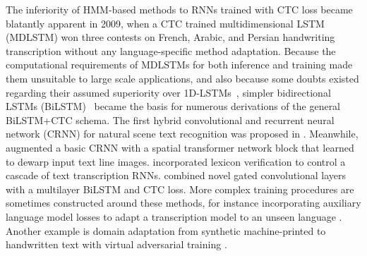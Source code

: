 The inferiority of HMM-based methods to RNNs trained with CTC loss became
blatantly apparent in 2009, when a CTC trained multidimensional LSTM (MDLSTM)
\cite{graves2008offline} won three contests on French, Arabic, and Persian
handwriting transcription without any language-specific method adaptation.
Because the computational requirements of MDLSTMs for both inference and
training made them unsuitable to large scale applications, and also because
some doubts existed regarding their assumed superiority over
1D-LSTMs~\cite{puigcerver2017multidimensional}, simpler bidirectional LSTMs
(BiLSTM)~\cite{graves2008novel} became the basis for numerous derivations of
the general BiLSTM+CTC schema. The first hybrid convolutional and recurrent
neural network (CRNN) for natural scene text recognition was proposed in
\cite{shi2016end}. Meanwhile, \cite{dutta2018improving} augmented a basic CRNN
with a spatial transformer network block that learned to dewarp input text line
images. \cite{stuner2016cohort} incorporated lexicon verification to control a
cascade of text transcription RNNs. \cite{bluche2017gated} combined novel gated
convolutional layers with a multilayer BiLSTM and CTC loss. More complex
training procedures are sometimes constructed around these methods, for
instance incorporating auxiliary language model losses to adapt a transcription
model to an unseen language \cite{tensmeyer2018language}. Another example is
domain adaptation from synthetic machine-printed to handwritten text with
virtual adversarial training \cite{keret2019transductive}.

